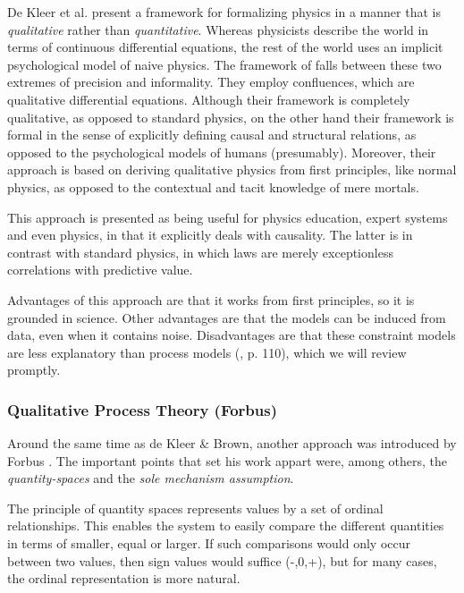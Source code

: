 \documentclass{article} %
\begin{document}
De Kleer et al. \cite{kleer} present a framework for formalizing physics in a
manner that is {\em qualitative} rather than {\em quantitative}. Whereas
physicists describe the world in terms of continuous differential equations,
the rest of the world uses an implicit psychological model of naive physics.
The framework of \cite{kleer} falls between these two extremes of precision and
informality. They employ confluences, which are qualitative differential
equations.  Although their framework is completely qualitative, as opposed to
standard physics, on the other hand their framework is formal in the sense of
explicitly defining causal and structural relations, as opposed to the
psychological models of humans (presumably). Moreover, their approach is based
on deriving qualitative physics from first principles, like normal physics, as
opposed to the contextual and tacit knowledge of mere mortals.

This approach is presented as being useful for physics education, expert
systems and even physics, in that it explicitly deals with causality. The
latter is in contrast with standard physics, in which laws are merely
exceptionless correlations with predictive value.

Advantages of this approach are that it works from first principles, so it is
grounded in science. Other advantages are that the models can be induced from
data, even when it contains noise. Disadvantages are that these constraint
models are less explanatory than process models (\cite{forbus}, p. 110), 
which we will review promptly.

\subsubsection{Qualitative Process Theory (Forbus)}

Around the same time as de Kleer \& Brown, another approach was introduced by
Forbus \cite{forbus}. The important points that set his work appart were,
among others, the \emph{quantity-spaces} and the \emph{sole mechanism
assumption}.

The principle of quantity spaces represents values by a set of ordinal
relationships. This enables the system to easily compare the different
quantities in terms of smaller, equal or larger. If such comparisons would
only occur between two values, then sign values would suffice (-,0,+), but for
many cases, the ordinal representation is more natural.

\vspace{0.8em}
\end{document}
